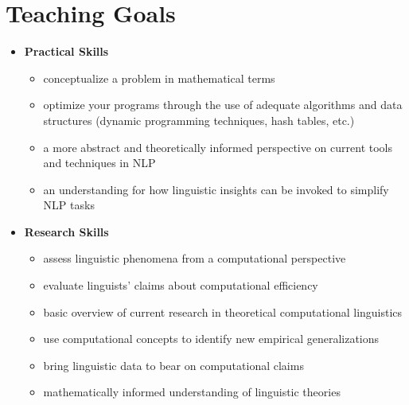 \section{Teaching Goals}
\begin{itemize}
    \item \textbf{Practical Skills}
        \begin{itemize}
            \item conceptualize a problem in mathematical terms
            \item optimize your programs through the use of adequate algorithms and data structures (dynamic programming techniques, hash tables, etc.)
            \item a more abstract and theoretically informed perspective on current tools and techniques in NLP
            \item an understanding for how linguistic insights can be invoked to simplify NLP tasks
        \end{itemize}
    \item \textbf{Research Skills}
        \begin{itemize}
            \item assess linguistic phenomena from a computational perspective
            \item evaluate linguists' claims about computational efficiency
            \item basic overview of current research in theoretical computational linguistics
            \item use computational concepts to identify new empirical generalizations
            \item bring linguistic data to bear on computational claims
            \item mathematically informed understanding of linguistic theories
        \end{itemize}
\end{itemize}


